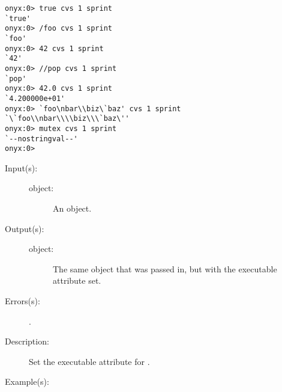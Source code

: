 \begin{description}
\begin{description}
\begin{verbatim}
onyx:0> true cvs 1 sprint
`true'
onyx:0> /foo cvs 1 sprint
`foo'
onyx:0> 42 cvs 1 sprint
`42'
onyx:0> //pop cvs 1 sprint
`pop'
onyx:0> 42.0 cvs 1 sprint
`4.200000e+01'
onyx:0> `foo\nbar\\biz\`baz' cvs 1 sprint
`\`foo\\nbar\\\\biz\\\`baz\''
onyx:0> mutex cvs 1 sprint
`--nostringval--'
onyx:0>
		\end{verbatim}
	\end{description}
\label{systemdict:cvx}
\item[{\onyxop{object}{cvx}{object}}: ]
	\begin{description}\item[]
	\item[Input(s): ]
		\begin{description}\item[]
		\item[object: ]
			An object.
		\end{description}
	\item[Output(s): ]
		\begin{description}\item[]
		\item[object: ]
			The same object that was passed in, but with the
			executable attribute set.
		\end{description}
	\item[Errors(s): ]
		\begin{description}\item[]
		\item[.]
		\end{description}
	\item[Description: ]
		Set the executable attribute for .
	\item[Example(s): ]\begin{verbatim}


\end{verbatim}
\end{description}
\end{description}
